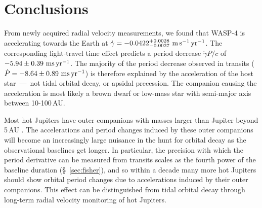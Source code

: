 \documentclass[12pt,twocolumn,tighten]{aastex62}
\begin{document}
\section{Conclusions}
\label{sec:conclusions}

From newly acquired radial velocity measurements, we found that WASP-4
is accelerating towards the Earth at $\dot{\gamma} =
-0.0422^{+0.0028}_{-0.0027}\ {\rm m}\,{\rm s}^{-1}\,{\rm yr}^{-1}$.
The corresponding light-travel time effect predicts a period decrease
$\dot{\gamma} P/c$ of $-5.94 \pm 0.39~{\rm ms}\,{\rm yr}^{-1}$.  The
majority of the period decrease observed in transits ($\dot{P}= - 8.64
\pm 0.89~{\rm ms}\,{\rm yr}^{-1}$) is therefore explained by the
acceleration of the host star~---~not tidal orbital decay, or apsidal
precession.  The companion causing the acceleration is most likely a
brown dwarf or low-mass star with semi-major axis between
10-100$\,$AU.

Most hot Jupiters have outer companions with masses larger than
Jupiter beyond 5$\,$AU
\citep{knutson_friends_2014,bryan_statistics_2016}. The accelerations
and period changes induced by these outer companions will become an
increasingly large nuisance in the hunt for orbital decay as the
observational baselines get longer.  In particular, the precision with
which the period derivative can be measured from transits scales as
the fourth power of the baseline duration (\S~\ref{sec:fisher}), and
so within a decade many more hot Jupiters should show orbital period
changes due to accelerations induced by their outer companions.  This
effect can be distinguished from tidal orbital decay through long-term
radial velocity monitoring of hot Jupiters.

\end{document}
